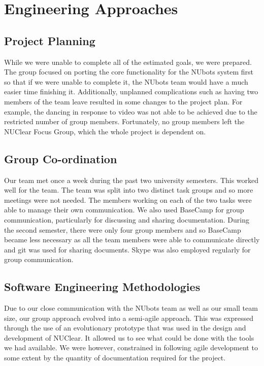 \documentclass[english,12pt]{scrartcl}
\begin{document}
\section{Engineering Approaches}
	\subsection{Project Planning}
		While we were unable to complete all of the estimated goals, we were prepared.
		The group focused on porting the core functionality for the NUbots system first so that if we were unable to complete it, the NUbots team would have a much easier time finishing it.
		Additionally, unplanned complications such as having two members of the team leave resulted in some changes to the project plan.
		For example, the dancing in response to video was not able to be achieved due to the restricted number of group members.
		Fortunately, no group members left the NUClear Focus Group, which the whole project is dependent on. 
	
	\subsection{Group Co-ordination}
		Our team met once a week during the past two university semesters.
		This worked well for the team.
		The team was split into two distinct task groups and so more meetings were not needed.
		The members working on each of the two tasks were able to manage their own communication.
		We also used BaseCamp for group communication, particularly for discussing and sharing documentation.
		During the second semester, there were only four group members and so BaseCamp became less necessary as all the team members were able to communicate directly and git was used for sharing documents.
		Skype was also employed regularly for group communication.
	
	\subsection{Software Engineering Methodologies}
		Due to our close communication with the NUbots team as well as our small team size, our group approach evolved into a semi-agile approach.
		This was expressed through the use of an evolutionary prototype that was used in the design and development of NUClear.
		It allowed us to see what could be done with the tools we had available.
		We were however, constrained in following agile development to some extent by the quantity of documentation required for the project.
		
\end{document}
